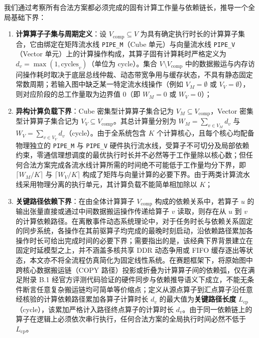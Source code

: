 \documentclass[anonymous,withtoc]{gmcm2026}
\providecommand{\tightlist}{\setlength{\itemsep}{0pt}\setlength{\parskip}{0pt}}
\begin{document}
我们通过考察所有合法方案都必须完成的固有计算工作量与依赖链长，推导一个全局基础下界：

\begin{enumerate}
\def\labelenumi{\arabic{enumi}.}
\tightlist
\item
  \textbf{计算算子子集与周期定义}：设 \(V_{\mathrm{comp}} \subseteq V\) 为具有确定执行时长的计算算子集合，它由绑定在矩阵流水线 \texttt{PIPE\_M}（Cube 单元）与向量流水线 \texttt{PIPE\_V}（Vector 单元）上的计算操作构成，其算子固有计算耗时严格定义为 \(d_v = \max(1, \text{cycles}_v)\)（单位为 cycle）。集合 \(V \setminus V_{\mathrm{comp}}\) 中的数据搬运与内存访问操作耗时取决于底层总线仲裁、动态带宽争用与缓存状态，不具有静态固定常数周期；若输入图中缺乏某一特定流水线操作（例如 \(V_M = \emptyset\) 或 \(V_V = \emptyset\)），则对应阶段的总工作量取为边界值 0（即 \(W_M = 0\) 或 \(W_V = 0\)）；
\item
  \textbf{异构计算负载下界}：Cube 密集型计算算子集合记为 \(V_M \subseteq V_{\mathrm{comp}}\)，Vector 密集型计算算子集合记为 \(V_V \subseteq V_{\mathrm{comp}}\)。其总计算量分别为 \(W_M = \sum_{v \in V_M} d_v\) 与 \(W_V = \sum_{v \in V_V} d_v\)（cycle）。由于全系统包含 \(K\) 个计算核心，且每个核心均配备物理独立的 \texttt{PIPE\_M} 与 \texttt{PIPE\_V} 硬件执行流水线，受算子不可切分及局部依赖约束，零通信理想调度的最优执行时长并不必然等于工作量除以核心数；但任何合法方案完成各流水线计算所需的时间绝不可能低于工作量均分下界，即 \(\lceil W_M / K \rceil\) 与 \(\lceil W_V / K \rceil\) 构成了矩阵与向量计算的必要下界。由于两类计算流水线采用物理分离的执行单元，其计算负载不能简单相加除以 \(K\)；
\item
  \textbf{关键路径依赖下界}：在由全体计算算子 \(V_{\mathrm{comp}}\) 构成的依赖关系中，若算子 \(u\) 的输出张量直接或通过中间数据搬运操作传递给算子 \(v\) 读取，则存在从 \(u\) 到 \(v\) 的计算依赖路径。在离散事件动态系统理论中，对于任务时长与依赖关系固定的同步系统，各操作在其前驱算子均完成的最晚时刻启动，沿依赖路径累加各操作时长可给出完成时间的必要下界\cite[11--12]{ref20}；需要指出的是，该经典下界背景建立在固定时延模型之上，并不涵盖多核共享 DDR 动态争用或 FIFO 缓存逐出等状态，本文亦不将全流程仿真简化为固定线性系统。在赛题框架下，将原始图中跨核心数据搬运链（COPY 路径）投影或折叠为计算算子间的依赖弧，仅在满足附录 B.1 经官方评测代码验证的硬件同步与依赖推导语义下成立，不能无条件断言任意复杂搬运链均可简单等价缩点；定义从源点算子到汇点算子沿任意经核验的计算依赖路径累加各算子计算时长 \(d_v\) 的最大值为\textbf{关键路径长度} \(L_{\mathrm{cp}}\)（cycle），该累加严格计入路径终点算子的计算时长 \(d_v\)。由于同一依赖链上的算子在逻辑上必须依次串行执行，任何合法方案的全局执行时间必然不低于 \(L_{\mathrm{cp}}\)。
\end{enumerate}
\end{document}
